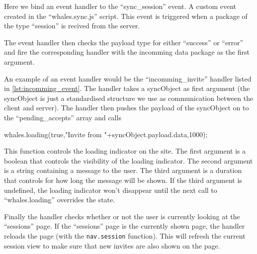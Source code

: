 Here we bind an event handler to the ``sync\_session'' event. A custom event
created in the ``whales.sync.js'' script. This event is triggered when a
package of the type ``session'' is recived from the server.


The event handler then checks the payload type for either ``success'' or
``error'' and fire the corresponding handler with the incomming data package as
the first argument.


An example of an event handler would be the ``incomming\_invite'' handler listed
in \ref{lst:incomming_event}. The handler takes a syncObject as first argument
(the syncObject is just a standardised structure we use as communication
between the client and server).
The handler then pushes the payload of the syncObject on to the
``pending\_accepts'' array and calls 

\begin{snippet}[firstnumber=3]
whales.loading(true,"Invite from "+syncObject.payload.data,1000);
\end{snippet}

This function controls the loading indicator on the site. The first argument is
a boolean that controls the visibility of the loading indicator. The second
argument is a string containing a message to the user. The third argument is a
duration that controls for how long the message will be shown. If the third
argument is undefined, the loading indicator won't disappear until the next call
to ``whales.loading'' overrides the state.


Finally the handler checks whether or not the user is currently looking at the
``sessions'' page. If the ``sessions'' page is the currently shown page, the
handler reloads the page (with the \lstinline$nav.session$ function). This will
refresh the current session view to make sure that new invites are also shown on
the page.
